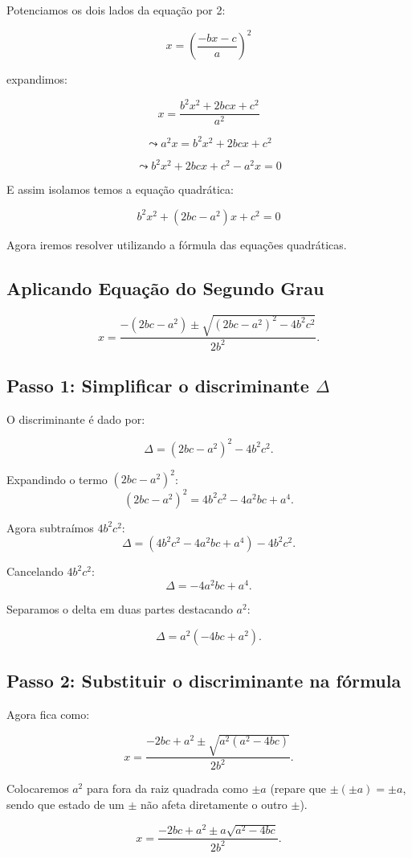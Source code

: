 \documentclass{article}
\begin{document}
Potenciamos os dois lados da equação por 2:

\[
x= \left( \frac{-bx - c}{a}\right)^2
\]

expandimos:

\[
x= \frac{b^2x^2+ 2bcx+c^2}{a^2}
\]

\[
\leadsto
a^2 x= b^2x^2+ 2bcx+c^2
\]

\[
\leadsto
b^2x^2+ 2bcx+c^2 - a^2x = 0
\]

E assim isolamos temos a equação quadrática:

\[
b^2x^2+ (2bc-a^2)x+c^2 = 0
\]

Agora iremos resolver utilizando a fórmula das equações quadráticas.

\subsection{Aplicando Equação do Segundo Grau}

\[
x = \frac{-(2bc - a^2) \pm \sqrt{(2bc - a^2)^2 - 4b^2c^2}}{2b^2}.
\]

\subsection{Passo 1: Simplificar o discriminante $\Delta$}
O discriminante é dado por:

\[
\Delta = (2bc - a^2)^2 - 4b^2c^2.
\]

Expandindo o termo $(2bc - a^2)^2$:
\[
(2bc - a^2)^2 = 4b^2c^2 - 4a^2bc + a^4.
\]

Agora subtraímos $4b^2c^2$:
\[
\Delta = (4b^2c^2 - 4a^2bc + a^4) - 4b^2c^2.
\]

Cancelando $4b^2c^2$:
\[
\Delta = -4a^2bc + a^4.
\]

Separamos o delta em duas partes destacando $a^2$:

\[
\Delta = a^2(-4bc + a^2).
\]

\subsection{Passo 2: Substituir o discriminante na fórmula}
Agora fica como:

\[
x = \frac{-2bc + a^2 \pm \sqrt{a^2(a^2-4bc)}}{2b^2}.
\]

Colocaremos $a^2$ para fora da raiz quadrada como $\pm a$ (repare que $\pm (\pm a) = \pm a$, sendo que estado de um $\pm$ não afeta diretamente o outro $\pm$).

\[
x = \frac{-2bc + a^2 \pm a\sqrt{a^2-4bc}}{2b^2}.
\]
\end{document}
